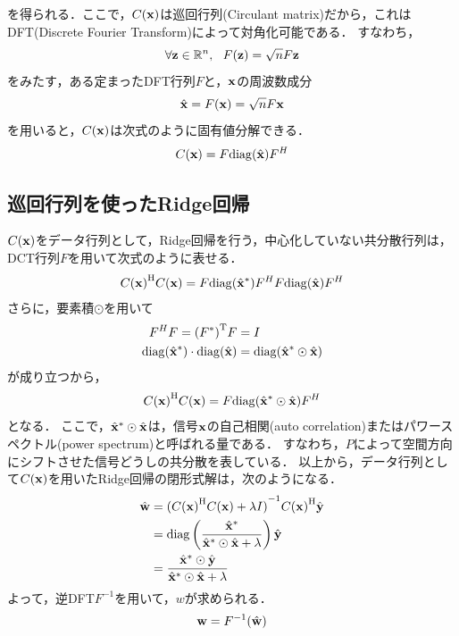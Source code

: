 \documentclass[11pt,a4j]{jarticle}
\begin{document}
      を得られる．ここで，$C({\bf x})$は巡回行列(Circulant matrix)だから，これはDFT(Discrete Fourier Transform)によって対角化可能である．
      すなわち，
      \begin{align}
        \forall {\bf z} \in \mathbb{R}^{n}, ~~ F({\bf z}) = \sqrt{n} F{\bf z}
      \end{align}
      をみたす，ある定まったDFT行列$F$と，$\bf x$の周波数成分
      \begin{align}
        \hat{\bf x} = F({\bf x}) = \sqrt{n} F{\bf x}
      \end{align}
      を用いると，$C({\bf x})$は次式のように固有値分解できる．
      \begin{align}
        C({\bf x}) = F {\rm diag} (\hat{\bf x}) {F}^{H}
      \end{align}

    \subsection{巡回行列を使ったRidge回帰}
      $C({\bf x})$をデータ行列として，Ridge回帰を行う，中心化していない共分散行列は，DCT行列$F$を用いて次式のように表せる．
      \begin{align}
        {C({\bf x})}^{\mathrm{H}}C({\bf x}) = F {\rm diag} (\hat{{\bf x}}^{*}) {F}^{H} F {\rm diag} (\hat{\bf x}) {F}^{H}
      \end{align}
      さらに，要素積$\odot$を用いて
      \begin{align}
        F^{H}F = {( F^{*} )}^{\mathrm{T}} F &= I \\
        {\rm diag} (\hat{{\bf x}}^{*})\cdot {\rm diag} (\hat{\bf x}) &= {\rm diag} ( \hat{{\bf x}}^{*} \odot \hat{\bf x} )
      \end{align}
      が成り立つから，
      \begin{align}
        {C({\bf x})}^{\mathrm{H}}C({\bf x}) = F {\rm diag} ( \hat{{\bf x}}^{*} \odot \hat{\bf x} ) {F}^{H}
      \end{align}
      となる．
      ここで，$\hat{{\bf x}}^{*} \odot \hat{\bf x}$は，信号$\bf x$の自己相関(auto correlation)またはパワースペクトル(power spectrum)と呼ばれる量である．
      すなわち，$P$によって空間方向にシフトさせた信号どうしの共分散を表している．
      以上から，データ行列として$C({\bf x})$を用いたRidge回帰の閉形式解は，次のようになる．
      \begin{align}
        \hat{\bf w} &= { ({C({\bf x})}^{\mathrm{H}} C({\bf x}) + \lambda I) }^{-1} {C({\bf x})}^{\mathrm{H}} \hat{\bf y} \\
                &= {\rm diag} \left( \frac{{\hat{\bf x}}^{*}}{\hat{{\bf x}}^{*} \odot \hat{\bf x} + \lambda} \right) \hat{\bf y} \\
                &= \frac{{\hat{\bf x}}^{*} \odot \hat{\bf y}}{\hat{{\bf x}}^{*} \odot \hat{\bf x} + \lambda} \\
      \end{align}
      よって，逆DFT${F}^{-1}$を用いて，$w$が求められる．
      \begin{align}
        {\bf w} = {F}^{-1}( \hat{\bf w} )
      \end{align}
\end{document}
